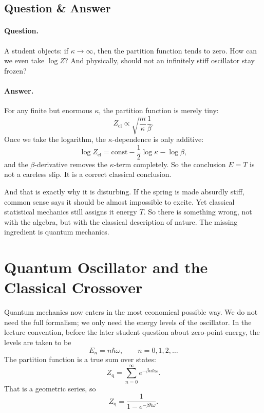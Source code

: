 \subsection{Question \& Answer}

\paragraph{Question.} A student objects: if \(\kappa\to\infty\), then the partition function tends to zero. How can we even take \(\log Z\)? And physically, should not an infinitely stiff oscillator stay frozen?

\paragraph{Answer.} For any finite but enormous \(\kappa\), the partition function is merely tiny:
\begin{equation}
Z_{\mathrm{cl}}\propto \sqrt{\frac{m}{\kappa}}\frac{1}{\beta}.
\end{equation}
Once we take the logarithm, the \(\kappa\)-dependence is only additive:
\begin{equation}
\log Z_{\mathrm{cl}}=\text{const}-\frac12\log\kappa-\log\beta,
\end{equation}
and the \(\beta\)-derivative removes the \(\kappa\)-term completely. So the conclusion \(E=T\) is not a careless slip. It is a correct classical conclusion.

And that is exactly why it is disturbing. If the spring is made absurdly stiff, common sense says it should be almost impossible to excite. Yet classical statistical mechanics still assigns it energy \(T\). So there is something wrong, not with the algebra, but with the classical description of nature. The missing ingredient is quantum mechanics.

\section{Quantum Oscillator and the Classical Crossover}

Quantum mechanics now enters in the most economical possible way. We do not need the full formalism; we only need the energy levels of the oscillator. In the lecture convention, before the later student question about zero-point energy, the levels are taken to be
\begin{equation}
E_n=n\hbar\omega,
\qquad
n=0,1,2,\dots
\end{equation}
The partition function is a true sum over states:
\begin{equation}
Z_{\mathrm{q}}=\sum_{n=0}^{\infty}e^{-\beta n\hbar\omega}.
\end{equation}
That is a geometric series, so
\begin{equation}
Z_{\mathrm{q}}=\frac{1}{1-e^{-\beta\hbar\omega}}.
\end{equation}

